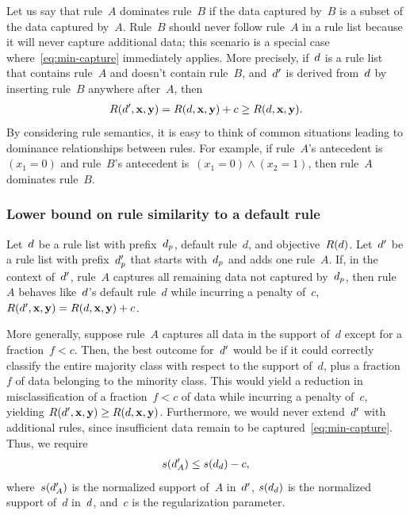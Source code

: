 Let us say that rule~$A$ dominates rule~$B$ if the data captured by~$B$ is a subset of the data captured by~$A$.
%
Rule~$B$ should never follow rule~$A$ in a rule list because it will never capture additional data;
this scenario is a special case where~\eqref{eq:min-capture} immediately applies.
%
More precisely, if~${d}$ is a rule list that contains rule~$A$ and doesn't contain rule~$B$,
and~${d}'$ is derived from~${d}$ by inserting rule~$B$ anywhere after~$A$, then
\begin{align}
\Obj(\RL', \x, \y) = \Obj(\RL, \x, \y) + c \ge \Obj(\RL, \x, \y).
\end{align}
By considering rule semantics, it is easy to think of common situations
leading to dominance relationships between rules.
%
For example, if rule~$A$'s antecedent is~${(x_1 = 0)}$ and rule~$B$'s
antecedent is~${(x_1 = 0) \wedge (x_2 = 1)}$, then rule~$A$ dominates rule~$B$.
%

\subsubsection{Lower bound on rule similarity to a default rule}

Let~${d}$ be a rule list with prefix~$d_p$, default rule~$d$, and objective~$R({d})$.
%
Let~${d}'$ be a rule list with prefix~$d_p'$ that starts with~$d_p$ and adds one rule~$A$.
%
If, in the context of~${d}'$, rule~$A$ captures all remaining data not captured by~$d_p$,
then rule~$A$ behaves like~${d}$'s default rule~$d$ while incurring a penalty of~$c$,
\ie ~${R({d}', \mathbf{x}, \mathbf{y}) = R({d}, \mathbf{x}, \mathbf{y}) + c}$.

More generally, suppose rule~$A$ captures all data in the support of~$d$
except for a fraction~${f < c}$.
%
Then, the best outcome for~${d}'$ would be if it could correctly classify
the entire majority class with respect to the support of~$d$,
plus a fraction~$f$ of data belonging to the minority class.
%
This would yield a reduction in misclassification of a fraction~${f < c}$
of data while incurring a penalty of~$c$, yielding
${R({d}', \mathbf{x}, \mathbf{y}) \ge R({d}, \mathbf{x}, \mathbf{y})}$.
%
Furthermore, we would never extend~${d}'$ with additional rules,
since insufficient data remain to be captured~\eqref{eq:min-capture}.
%
Thus, we require
\begin{align}
s(\RL'_A) \le s(\RL_d) - c,
\label{eq:max-capture}
\end{align}
where~$s({d}'_A)$ is the normalized support of~$A$ in~${d}'$,
$s({d}_d)$ is the normalized support of~$d$ in~${d}$,
and~$c$ is the regularization parameter.

